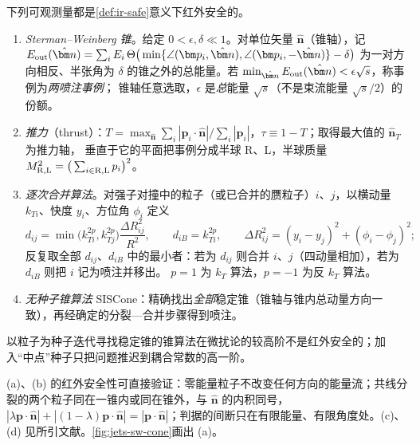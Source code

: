 \begin{definition}[红外安全的喷注定义与事件形状]\label{def:jets-algorithms}
下列可观测量都是\cref{def:ir-safe}意义下红外安全的。
\begin{enumerate}[label=(\alph*),leftmargin=2.2em,itemsep=1pt,topsep=2pt]
\item \emph{Sterman--Weinberg 锥}\cite{StermanWeinberg1977}。给定 $0<\epsilon,\delta\ll1$。对单位矢量 $\hat{\bm n}$（锥轴），记
$E_{\rm out}(\hat{\bm n})=\sum_iE_i\,\Theta\big(\min\{\angle(\bm p_i,\hat{\bm n}),\angle(\bm p_i,-\hat{\bm n})\}-\delta\big)$
为一对方向相反、半张角为 $\delta$ 的锥之外的总能量。若 $\min_{\hat{\bm n}}E_{\rm out}(\hat{\bm n})<\epsilon\sqrt s$，称事例为\emph{两喷注事例}；
锥轴任意选取，$\epsilon$ 是\emph{总}能量 $\sqrt s$（不是束流能量 $\sqrt s/2$）的份额。
\item \emph{推力}（thrust）\cite{Farhi1977}：$T=\max_{\hat{\bm n}}\sum_i|\bm p_i\cdot\hat{\bm n}|/\sum_i|\bm p_i|$，$\tau\equiv1-T$；取得最大值的 $\hat{\bm n}_T$ 为推力轴，
垂直于它的平面把事例分成半球 R、L，半球质量 $M_{\rm R,L}^2=\big(\sum_{i\in\mathrm{R,L}}p_i\big)^2$。
\item \emph{逐次合并算法}。对强子对撞中的粒子（或已合并的赝粒子）$i$、$j$，以横动量 $k_{Ti}$、快度 $y_i$、方位角 $\phi_i$ 定义
\begin{equation}\label{eq:jets-kt}
d_{ij}=\min\big(k_{Ti}^{2p},k_{Tj}^{2p}\big)\frac{\Delta R_{ij}^2}{R^2},\qquad d_{iB}=k_{Ti}^{2p},\qquad
\Delta R_{ij}^2=(y_i-y_j)^2+(\phi_i-\phi_j)^2 ;
\end{equation}
反复取全部 $d_{ij}$、$d_{iB}$ 中的最小者：若为 $d_{ij}$ 则合并 $i$、$j$（四动量相加），若为 $d_{iB}$ 则把 $i$ 记为喷注并移出。
$p=1$ 为 $k_T$ 算法\cite{CataniEtAl1993kt,EllisSoper1993}，$p=-1$ 为反 $k_T$ 算法\cite{CacciariSalamSoyez2008}。
\item \emph{无种子锥算法} SISCone\cite{SalamSoyez2007}：精确找出\emph{全部}稳定锥（锥轴与锥内总动量方向一致），再经确定的分裂—合并步骤得到喷注。
\end{enumerate}
以粒子为种子迭代寻找稳定锥的锥算法在微扰论的较高阶不是红外安全的；加入“中点”种子只把问题推迟到耦合常数的高一阶\cite{SalamSoyez2007}。
\end{definition}

(a)、(b) 的红外安全性可直接验证：零能量粒子不改变任何方向的能量流；共线分裂的两个粒子同在一锥内或同在锥外，与 $\hat{\bm n}$ 的内积同号，
$|\lambda\bm p\cdot\hat{\bm n}|+|(1-\lambda)\bm p\cdot\hat{\bm n}|=|\bm p\cdot\hat{\bm n}|$；判据的间断只在有限能量、有限角度处。(c)、(d) 见所引文献。\cref{fig:jets-sw-cone}画出 (a)。

